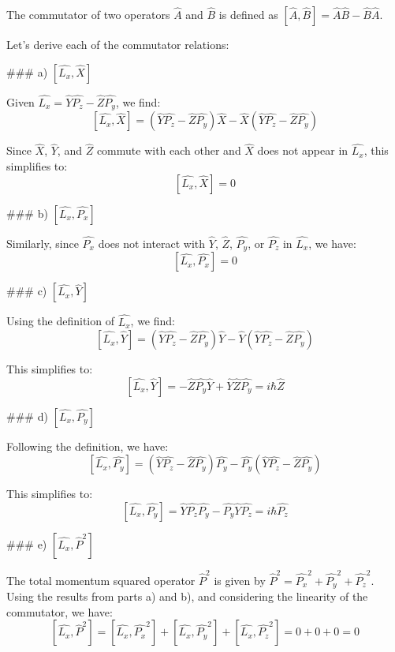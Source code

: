 The commutator of two operators \( \hat{A} \) and \( \hat{B} \) is defined as \( [ \hat{A}, \hat{B} ] = \hat{A}\hat{B} - \hat{B}\hat{A} \).

Let's derive each of the commutator relations:

### a) \( [ \hat{L_{x}}, \hat{X} ] \)

Given \( \hat{L_{x}} = \hat{Y}\hat{P_{z}} - \hat{Z}\hat{P_{y}} \), we find:
\[ [ \hat{L_{x}}, \hat{X} ] = (\hat{Y}\hat{P_{z}} - \hat{Z}\hat{P_{y}})\hat{X} - \hat{X}(\hat{Y}\hat{P_{z}} - \hat{Z}\hat{P_{y}}) \]

Since \( \hat{X} \), \( \hat{Y} \), and \( \hat{Z} \) commute with each other and \( \hat{X} \) does not appear in \( \hat{L_{x}} \), this simplifies to:
\[ [ \hat{L_{x}}, \hat{X} ] = 0 \]

### b) \( [ \hat{L_{x}}, \hat{P_{x}} ] \)

Similarly, since \( \hat{P_{x}} \) does not interact with \( \hat{Y} \), \( \hat{Z} \), \( \hat{P_{y}} \), or \( \hat{P_{z}} \) in \( \hat{L_{x}} \), we have:
\[ [ \hat{L_{x}}, \hat{P_{x}} ] = 0 \]

### c) \( [ \hat{L_{x}}, \hat{Y} ] \)

Using the definition of \( \hat{L_{x}} \), we find:
\[ [ \hat{L_{x}}, \hat{Y} ] = (\hat{Y}\hat{P_{z}} - \hat{Z}\hat{P_{y}})\hat{Y} - \hat{Y}(\hat{Y}\hat{P_{z}} - \hat{Z}\hat{P_{y}}) \]

This simplifies to:
\[ [ \hat{L_{x}}, \hat{Y} ] = -\hat{Z}\hat{P_{y}}\hat{Y} + \hat{Y}\hat{Z}\hat{P_{y}} = i\hbar\hat{Z} \]

### d) \( [ \hat{L_{x}}, \hat{P_{y}} ] \)

Following the definition, we have:
\[ [ \hat{L_{x}}, \hat{P_{y}} ] = (\hat{Y}\hat{P_{z}} - \hat{Z}\hat{P_{y}})\hat{P_{y}} - \hat{P_{y}}(\hat{Y}\hat{P_{z}} - \hat{Z}\hat{P_{y}}) \]

This simplifies to:
\[ [ \hat{L_{x}}, \hat{P_{y}} ] = \hat{Y}\hat{P_{z}}\hat{P_{y}} - \hat{P_{y}}\hat{Y}\hat{P_{z}} = i\hbar\hat{P_{z}} \]

### e) \( [ \hat{L_{x}}, \hat{P}^{2} ] \)

The total momentum squared operator \( \hat{P}^{2} \) is given by \( \hat{P}^{2} = \hat{P_{x}}^{2} + \hat{P_{y}}^{2} + \hat{P_{z}}^{2} \). Using the results from parts a) and b), and considering the linearity of the commutator, we have:
\[ [ \hat{L_{x}}, \hat{P}^{2} ] = [ \hat{L_{x}}, \hat{P_{x}}^{2} ] + [ \hat{L_{x}}, \hat{P_{y}}^{2} ] + [ \hat{L_{x}}, \hat{P_{z}}^{2} ] = 0 + 0 + 0 = 0 \]

